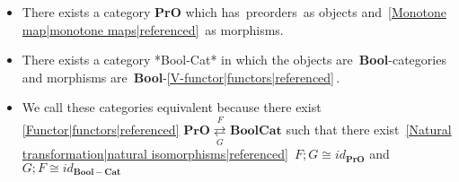 
\begin{itemize}
    \item  There exists a category \textbf{PrO} which has \,preorders\, as objects and \,\ref{Monotone map|monotone maps|referenced}\, as morphisms.
    \item There exists a category *Bool-Cat* in which the objects are \,\textbf{Bool}-categories\, and morphisms are \,\textbf{Bool}-\ref{V-functor|functors|referenced}\,.
    \item We call these categories equivalent because there exist \ref{Functor|functors|referenced} $\mathbf{PrO}\overset{F}{\underset{G}{\rightleftarrows}}\mathbf{BoolCat}$ such that there exist \,\ref{Natural transformation|natural isomorphisms|referenced}\, $F;G \cong id_\mathbf{PrO}$ and $G;F \cong id_\mathbf{Bool-Cat}$
  \end{itemize}

